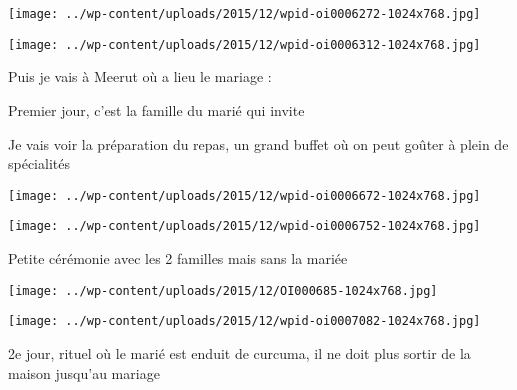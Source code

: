  

 

\begin{center} \texttt{[image: ../wp-content/uploads/2015/12/wpid-oi0006272-1024x768.jpg]} \end{center}

 

 

\begin{center} \texttt{[image: ../wp-content/uploads/2015/12/wpid-oi0006312-1024x768.jpg]} \end{center}

 

 Puis je vais à Meerut où a lieu le mariage : 

 Premier jour, c'est la famille du marié qui invite 

 Je vais voir la préparation du repas, un grand buffet où on peut goûter à plein de spécialités 

 

\begin{center} \texttt{[image: ../wp-content/uploads/2015/12/wpid-oi0006672-1024x768.jpg]} \end{center}

 

 

\begin{center} \texttt{[image: ../wp-content/uploads/2015/12/wpid-oi0006752-1024x768.jpg]} \end{center}

 

 Petite cérémonie avec les 2 familles mais sans la mariée 

 

\begin{center} \texttt{[image: ../wp-content/uploads/2015/12/OI000685-1024x768.jpg]} \end{center}

 

 

\begin{center} \texttt{[image: ../wp-content/uploads/2015/12/wpid-oi0007082-1024x768.jpg]} \end{center}

 

 2e jour, rituel où le marié est enduit de curcuma, il ne doit plus sortir de la maison jusqu'au mariage 

 

